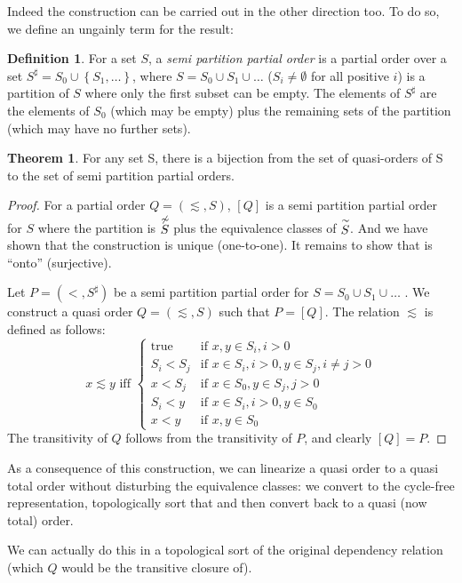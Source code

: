 \documentclass[12pt]{article}
\theoremstyle{definition}
\newtheorem{definition}{Definition}[section]
\theoremstyle{theorem}
\newtheorem{theorem}{Theorem}[section]
\def\aset#1{\left\{{#1}\right\}}
\begin{document}
Indeed the construction can be carried out in the other direction too.
To do so, we define an ungainly term for the result:
\begin{definition}
  For a set $S$, a \emph{semi partition partial order} is a partial
  order over a set \(S^{\sharp} = S_0 \cup \aset{S_1,\ldots}\), where  \(S =
  S_0 \cup S_1 \cup \ldots \) ($S_i\neq \emptyset$ for all
  positive $i$) is a partition of $S$ where only the first subset can
  be empty. The elements of
  \(S^{\sharp}\) are the elements of $S_0$ (which may be empty) plus
  the remaining sets of the partition (which may have no further sets).
\end{definition}
\begin{theorem}
  For any set S, there is a bijection from the set of quasi-orders of
  S to the set of semi partition partial orders.
\end{theorem}
\begin{proof}
  For a partial order $Q=(\lesssim,S)$, $[Q]$ is a semi partition
  partial order for $S$ where the partition is $\stackrel{\not\sim}{S}$ plus
  the equivalence classes of $\stackrel{\sim}{S}$. And we have shown that the
  construction is unique (one-to-one).  It remains to show that is
  ``onto'' (surjective).

  Let $P=(<,S^{\sharp})$ be a semi partition partial order for
  $S = S_0 \cup S_1 \cup \ldots$ .  We
  construct a quasi order $Q=(\lesssim,S)$ such that $P = [Q]$.
  The relation $\lesssim$ is defined as follows:
  \[
  x \lesssim y \textrm{ iff }
  \left\{
  \begin{array}{cl}
    \textrm{true}& \textrm{if } x,y \in S_i, i > 0 \\
    S_i < S_j & \textrm{if } x \in S_i, i > 0, y \in S_j, i \neq j > 0 \\
    x < S_j   & \textrm{if } x \in S_0, y \in S_j, j > 0 \\     
    S_i < y   & \textrm{if } x \in S_i, i > 0, y \in S_0 \\
    x < y     & \textrm{if } x, y \in S_0
  \end{array}\right.
  \]
  The transitivity of $Q$ follows from the transitivity of $P$, and
  clearly $[Q] = P$.
\end{proof}

As a consequence of this construction, we can linearize a quasi order
to a quasi total order without disturbing the equivalence classes: we
convert to the cycle-free representation, topologically sort that and
then convert back to a quasi (now total) order.

We can actually do this in a topological sort of the original
dependency relation (which $Q$ would be the transitive closure of).
\end{document}
